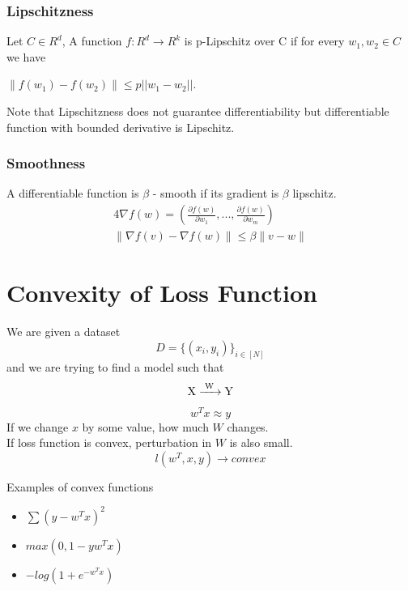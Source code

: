 \documentclass[12pt]{article}
\begin{document}
\subsubsection{Lipschitzness}
Let $C \in R^d$, A function $f: R^d \rightarrow R^k$ is p-Lipschitz over C if for every $w_1, w_2 \in C$ we have \begin{center}$\|f(w_1)-f(w_2)\| \leq p||w_1-w_2||$.\end{center}
Note that Lipschitzness does not guarantee differentiability but differentiable function with bounded derivative is Lipschitz.

\subsubsection{Smoothness}
A differentiable function is $\beta$ - smooth if its gradient is $\beta$ lipschitz.
\begin{alignat*}{4}
    \nabla f(w) = (\frac{\partial f(w)}{\partial w_1}, ..., \frac{\partial f(w)}{\partial w_m})\\
    \|\nabla f(v) - \nabla f(w)\| \leq \beta \|v-w\| 
\end{alignat*}

\noindent{}



\section{Convexity of Loss Function}
We are given a dataset\\
$$D=\{(x_i,y_i)\}_{i\in[N]} $$
and we are trying to find a model such that
$$\ce{X ->[W] Y}$$
$${w^T}x\approx{y}$$
If we change $x$ by some value, how much $W$ changes.\\
If loss function is convex, perturbation in $W$ is also small.\\
$$l(w^T,x,y)\rightarrow{convex}$$

Examples of convex functions
\begin{itemize}
    \item $\sum{(y-{w^T}x)}^2$
    \item $max(0,1-y{w^T}x)$
    \item $-log(1+{e^{-{w^T}x}})$
\end{itemize}
\end{document}

